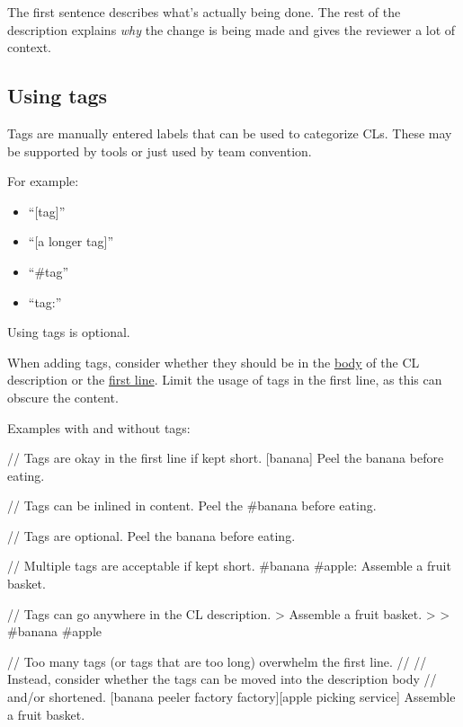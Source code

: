 \documentclass[
]{article}
\newenvironment{Shaded}{}{}
\newcommand{\NormalTok}[1]{#1}
\providecommand{\tightlist}{%
  \setlength{\itemsep}{0pt}\setlength{\parskip}{0pt}}
\begin{document}
The first sentence describes what's actually being done. The rest of the
description explains \emph{why} the change is being made and gives the
reviewer a lot of context.

\subsection{Using tags}\label{tags}

Tags are manually entered labels that can be used to categorize CLs.
These may be supported by tools or just used by team convention.

For example:

\begin{itemize}
\tightlist
\item
  ``{[}tag{]}''
\item
  ``{[}a longer tag{]}''
\item
  ``\#tag''
\item
  ``tag:''
\end{itemize}

Using tags is optional.

When adding tags, consider whether they should be in the
\hyperref[informative]{body} of the CL description or the
\hyperref[first-line]{first line}. Limit the usage of tags in the first
line, as this can obscure the content.

Examples with and without tags:

\begin{Shaded}
\begin{Highlighting}[]
\NormalTok{// Tags are okay in the first line if kept short.}
\NormalTok{[banana] Peel the banana before eating.}

\NormalTok{// Tags can be inlined in content.}
\NormalTok{Peel the \#banana before eating.}

\NormalTok{// Tags are optional.}
\NormalTok{Peel the banana before eating.}

\NormalTok{// Multiple tags are acceptable if kept short.}
\NormalTok{\#banana \#apple: Assemble a fruit basket.}

\NormalTok{// Tags can go anywhere in the CL description.}
\NormalTok{\textgreater{} Assemble a fruit basket.}
\NormalTok{\textgreater{}}
\NormalTok{\textgreater{} \#banana \#apple}
\end{Highlighting}
\end{Shaded}

\begin{Shaded}
\begin{Highlighting}[]
\NormalTok{// Too many tags (or tags that are too long) overwhelm the first line.}
\NormalTok{//}
\NormalTok{// Instead, consider whether the tags can be moved into the description body}
\NormalTok{// and/or shortened.}
\NormalTok{[banana peeler factory factory][apple picking service] Assemble a fruit basket.}
\end{Highlighting}
\end{Shaded}
\end{document}
